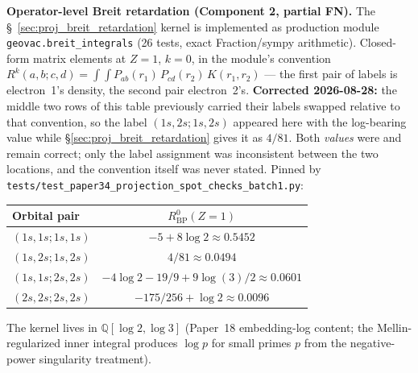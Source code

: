 \documentclass[11pt]{article}
\begin{document}
\textbf{Operator-level Breit retardation (Component 2, partial FN).}  The
\S~\ref{sec:proj_breit_retardation} kernel is implemented as production
module \texttt{geovac.breit\_integrals} (26 tests, exact
Fraction/sympy arithmetic).  Closed-form matrix elements at $Z=1$, $k=0$,
in the module's convention
$R^k(a,b;c,d) = \int\!\!\int P_{ab}(r_1)\, P_{cd}(r_2)\, K(r_1,r_2)$
--- the first pair of labels is electron~1's density, the second pair
electron~2's.  \textbf{Corrected 2026-08-28:} the middle two rows of
this table previously carried their labels swapped relative to that
convention, so the label $(1s,2s;1s,2s)$ appeared here with the
log-bearing value while \S\ref{sec:proj_breit_retardation} gives it as
$4/81$.  Both \emph{values} were and remain correct; only the label
assignment was inconsistent between the two locations, and the
convention itself was never stated.  Pinned by
\texttt{tests/test\_paper34\_projection\_spot\_checks\_batch1.py}:

\begin{table}[h]
\centering\small
\begin{tabular}{l c}
\toprule
Orbital pair & $R^0_\text{BP}(Z=1)$ \\
\midrule
$(1s,1s; 1s,1s)$ & $-5 + 8\log 2 \approx 0.5452$ \\
$(1s,2s; 1s,2s)$ & $4/81 \approx 0.0494$ \\
$(1s,1s; 2s,2s)$ & $-4\log 2 - 19/9 + 9\log(3)/2 \approx 0.0601$ \\
$(2s,2s; 2s,2s)$ & $-175/256 + \log 2 \approx 0.0096$ \\
\bottomrule
\end{tabular}
\end{table}

\noindent
The kernel lives in $\mathbb{Q}[\log 2, \log 3]$ (Paper~18 embedding-log
content; the Mellin-regularized inner integral produces $\log p$ for
small primes $p$ from the negative-power singularity treatment).
\end{document}
